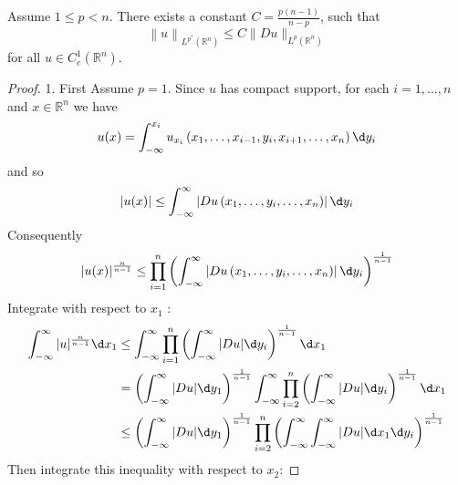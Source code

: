 \begin{theorem}
    Assume $1 \leq p < n$.
    There exists a constant $C=\frac{p(n-1)}{n-p}$, such that
    \begin{equation*}
        \left\|u\right\|_{L^{p^*}\left(\mathbb{R}^n\right)} \leq C\| D u\|_{L^p\left(\mathbb{R}^n\right)}
    \end{equation*}
    for all $u \in C_c^1\left(\mathbb{R}^n\right)$.
    \begin{proof}
        1. First Assume $p=1$. Since $u$ has compact support, for each $i=1,\ldots,n$ and $x\in \mathbb{R}^n$ we have
        \begin{equation*}
            u(x)=\int_{-\infty}^{x_i} u_{x_i}\left(x_1, \ldots, x_{i-1}, y_i, x_{i+1}, \ldots, x_n\right) \d  y_i
        \end{equation*}
        and so
        \begin{equation*}
            \left|u(x)\right| \leq \int_{-\infty}^{\infty}\left|D u\left(x_1, \ldots, y_i, \ldots, x_n\right)\right| \d  y_i
        \end{equation*}
        Consequently
        \begin{equation}
            \left|u(x)\right|^{\frac{n}{n-1}} \leq \prod_{i=1}^n\left(\int_{-\infty}^{\infty}\left|D u\left(x_1, \ldots, y_i, \ldots, x_n\right)\right| \d  y_i\right)^{\frac{1}{n-1}}
        \end{equation}
        Integrate  with respect to $x_1$ :
        \begin{equation*}
            \begin{aligned}
                \int_{-\infty}^{\infty}|u|^{\frac{n}{n-1}} \d  x_1 & \leq \int_{-\infty}^{\infty} \prod_{i=1}^n\left(\int_{-\infty}^{\infty}|D u| \d  y_i\right)^{\frac{1}{n-1}} \d  x_1                                                                \\
                                                                   & =\left(\int_{-\infty}^{\infty}|D u| \d  y_1\right)^{\frac{1}{n-1}} \int_{-\infty}^{\infty} \prod_{i=2}^n\left(\int_{-\infty}^{\infty}|D u| \d   y_i\right)^{\frac{1}{n-1}} \d  x_1 \\
                                                                   & \leq\left(\int_{-\infty}^{\infty}|D u| \d  y_1\right)^{\frac{1}{n-1}}
                \prod_{i=2}^n \left(\int_{-\infty}^{\infty} \int_{-\infty}^{\infty}|D u| \d  x_1 \d y_i\right)^{\frac{1}{n-1}}
            \end{aligned}
        \end{equation*}
        Then integrate this inequality with respect to $x_2$:


\end{proof}
\end{theorem}

